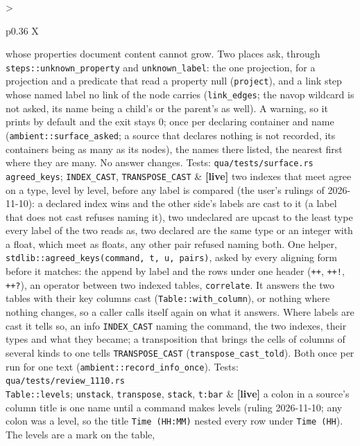 \documentclass{report}
\newcommand{\live}{\textbf{\textcolor{blue!60!black}{[live]}}\xspace}
\begin{document}
\begin{xltabular}{\textwidth}{>{\raggedright\arraybackslash}p{0.36\textwidth} X}
    whose properties document content cannot grow. Two places ask,
    through \texttt{steps::unknown\_property} and
    \texttt{unknown\_label}: the one projection, for a projection
    and a predicate that read a property null (\texttt{project}),
    and a link step whose named label no link of the node carries
    (\texttt{link\_edges}; the navop wildcard is not asked, its
    name being a child's or the parent's as well). A warning, so it
    prints by default and the exit stays 0; once per declaring
    container and name (\texttt{ambient::surface\_asked}; a source
    that declares nothing is not recorded, its containers being as
    many as its nodes), the names there listed, the nearest first
    where they are many. No answer changes. Tests:
    \texttt{qua/tests/surface.rs} \\
\texttt{agreed\_keys}; \texttt{INDEX\_CAST}, \texttt{TRANSPOSE\_CAST}
  & \live two indexes that meet agree on a type, level by level,
    before any label is compared (the user's rulings of 2026-11-10):
    a declared index wins and the other side's labels are cast to it
    (a label that does not cast refuses naming it), two undeclared
    are upcast to the least type every label of the two reads as,
    two declared are the same type or an integer with a float, which
    meet as floats, any other pair refused naming both. One helper,
    \texttt{stdlib::agreed\_keys(command, t, u, pairs)}, asked by
    every aligning form before it matches: the append by label and
    the rows under one header (\texttt{++}, \texttt{++!},
    \texttt{++?}), an
    operator between two indexed tables, \texttt{correlate}. It
    answers the two tables with their key columns cast
    (\texttt{Table::with\_column}), or nothing where nothing
    changes, so a caller calls itself again on what it answers.
    Where labels are cast it tells so, an info \texttt{INDEX\_CAST}
    naming the command, the two indexes, their types and what they
    became; a transposition that brings the cells of columns of
    several kinds to one tells \texttt{TRANSPOSE\_CAST}
    (\texttt{transpose\_cast\_told}). Both once per run for one
    text (\texttt{ambient::record\_info\_once}). Tests:
    \texttt{qua/tests/review\_1110.rs} \\
\texttt{Table::levels}; \texttt{unstack}, \texttt{transpose}, \texttt{stack}, \texttt{t:bar}
  & \live a colon in a source's column title is one name until a
    command makes levels (ruling 2026-11-10; any colon was a level,
    so the title \texttt{Time (HH:MM)} nested every row under
    \texttt{Time (HH}). The levels are a mark on the table,

\end{xltabular}
\end{document}
